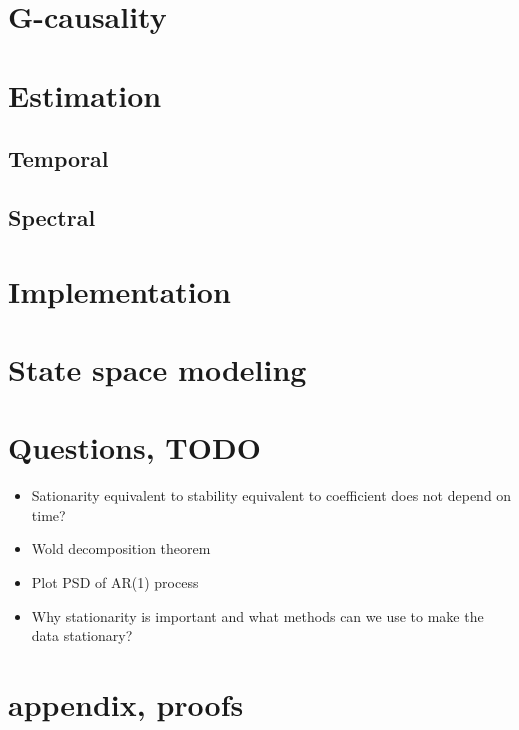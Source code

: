 \documentclass{article}
\theoremstyle{definition}
\begin{document}
\section{G-causality}
\section{Estimation}
\subsection{Temporal}
\subsection{Spectral}
\section{Implementation}
\section{State space modeling}
\section{Questions, TODO}
\begin{itemize}
\item Sationarity equivalent to stability equivalent to coefficient does not depend on time?
\item Wold decomposition theorem
\item Plot PSD of AR(1) process
\item Why stationarity is important and what methods can we use to make the data stationary?
\end{itemize}
\section{appendix, proofs}
\end{document}
